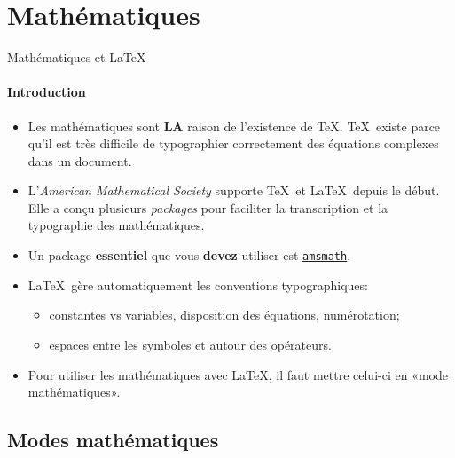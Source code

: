 
\section{Mathématiques}

\begin{frame}[c]{Mathématiques et \LaTeX}
	\framesubtitle{Introduction}

	\begin{itemize}
		\item Les mathématiques sont \textbf{LA} raison de l'existence de \TeX. \TeX\ existe parce qu'il est très difficile de typographier correctement des équations complexes dans un document.
		\item L'\emph{American Mathematical Society} supporte \TeX\ et \LaTeX\ depuis le début. Elle a conçu plusieurs \emph{packages} pour faciliter la transcription et la typographie des mathématiques.
		\item Un package \textbf{essentiel} que vous \textbf{devez} utiliser est 
		\href{https://ctan.org/pkg/amsmath}{\texttt{amsmath}}.
		\item \LaTeX\ gère automatiquement les conventions typographiques:
		\begin{itemize}
			\scriptsize
			\item constantes vs variables, disposition des équations, numérotation;
			\item espaces entre les symboles et autour des opérateurs.
		\end{itemize}
		\item Pour utiliser les mathématiques avec \LaTeX, il faut mettre celui-ci en «mode mathématiques».
	\end{itemize}
\end{frame}

\subsection{Modes mathématiques}

